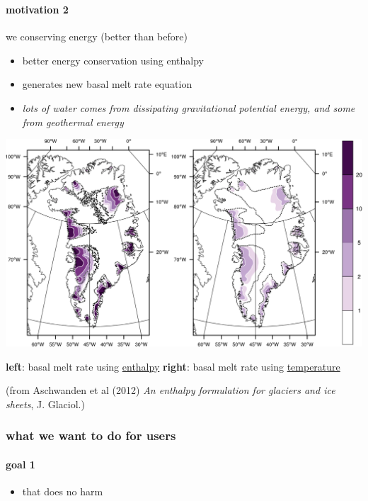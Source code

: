 \documentclass[hide notes,intlimits]{beamer}
\begin{document}
\begin{frame}
  \frametitle{\whytitle}
  \framesubtitle{motivation 2}
  
\begin{center}
  we  conserving energy (better than before)
\end{center}
  
  \begin{itemize}
    \item better energy conservation using enthalpy
    \item generates new basal melt rate equation
    \item \emph{lots of water comes from dissipating gravitational potential energy, and some from geothermal energy}
  \end{itemize}

  \begin{center}
    \includegraphics[height=0.4\textheight]{figs/enthalpy-model-crop}
    
    \medskip
    \scriptsize \textbf{left}: basal melt rate using \underline{enthalpy} \qquad \textbf{right}: basal melt rate using \underline{temperature}

    \tiny (from Aschwanden et al (2012) \emph{An enthalpy formulation for glaciers and ice sheets}, J. Glaciol.)
  \end{center}
\end{frame}


\newcommand{\goaltitle}{what we want to do for users}


\begin{frame}
  \frametitle{\goaltitle}
  \framesubtitle{goal 1}
  
\begin{center}
\end{center}
  
  \begin{itemize}
    \item that does no harm
  \end{itemize}
\end{frame}
\end{document}
